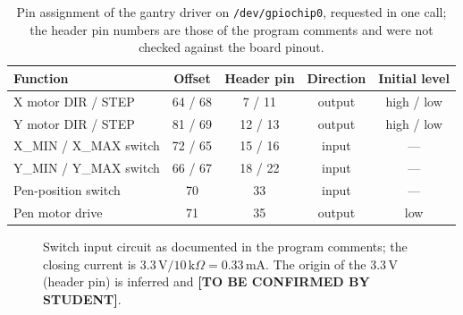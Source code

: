 \begin{table}[!htbp]
\centering
\fontsize{9.5}{11.5}\selectfont
\begin{tabularx}{\linewidth}{|X|c|c|c|c|}
\hline
\textbf{Function} & \textbf{Offset} & \textbf{Header pin} & \textbf{Direction} & \textbf{Initial level} \\
\hline
X motor DIR / STEP & 64 / 68 & 7 / 11 & output & high / low \\
\hline
Y motor DIR / STEP & 81 / 69 & 12 / 13 & output & high / low \\
\hline
X\_MIN / X\_MAX switch & 72 / 65 & 15 / 16 & input & --- \\
\hline
Y\_MIN / Y\_MAX switch & 66 / 67 & 18 / 22 & input & --- \\
\hline
Pen-position switch & 70 & 33 & input & --- \\
\hline
Pen motor drive & 71 & 35 & output & low \\
\hline
\end{tabularx}
\caption{Pin assignment of the gantry driver on \texttt{/dev/gpiochip0}, requested in one call; the header pin numbers are those of the program comments and were not checked against the board pinout.}
\label{tab:gan-pins}
\end{table}

\begin{figure}[!htbp]
\centering
{}
\caption{Switch input circuit as documented in the program comments; the closing current is $3.3\,\mathrm{V}/10\,\mathrm{k}\Omega=0.33$\,mA. The origin of the 3.3\,V (header pin) is inferred and \textbf{[TO BE CONFIRMED BY STUDENT]}.}
\label{fig:gan-switch}
\end{figure}

